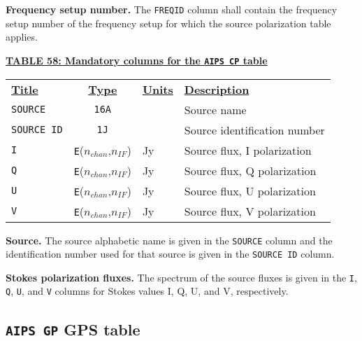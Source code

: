 \documentclass[twoside]{article}
\newcommand{\nif}{$n_{IF}$}
\newcommand{\nchan}{$n_{chan}$}
\begin{document}
{\bf Frequency setup number.}  The {\tt FREQID} column shall contain
the frequency setup number of the frequency setup for which the
source polarization table applies.

\begin{center}
\underline{\bf{TABLE 58: Mandatory columns for the {\tt AIPS CP} table}}\\
\begin{tabular}{lcll}
\noalign{\vspace{2pt}} \label{ta:CPcols}
\underline{{\bf Title\vphantom{y}}} & \underline{\bf{Type}} &
   \underline{{\bf Units\vphantom{y}}} & \underline{\bf{Description}} \\
\noalign{\vspace{2pt}}
{\tt SOURCE}    & {\tt 16A} &    & Source name \\
{\tt SOURCE ID} & {\tt 1J}  &    & Source identification number \\
{\tt I}         & {\tt E}(\nchan,\nif) & Jy & Source flux, I polarization \\
{\tt Q}         & {\tt E}(\nchan,\nif) & Jy & Source flux, Q polarization \\
{\tt U}         & {\tt E}(\nchan,\nif) & Jy & Source flux, U polarization \\
{\tt V}         & {\tt E}(\nchan,\nif) & Jy & Source flux, V polarization
\end{tabular}
\end{center}

{\bf Source.}  The source alphabetic name is given in the {\tt SOURCE}
column and the identification number used for that source is given in
the {\tt SOURCE ID} column.

{\bf Stokes polarization fluxes.} The spectrum of the source fluxes is
given in the {\tt I}, {\tt Q}, {\tt U}, and {\tt V} columns for Stokes
values I, Q, U, and V, respectively.

\subsection{{\tt AIPS GP} GPS table}
\label{s:GP}
\end{document}
